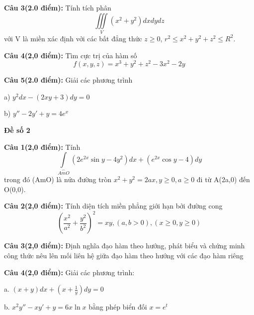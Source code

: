 \documentclass[14pt, a4paper]{article}
\begin{document}
	\vspace{0.5cm}
	
	\textbf{Câu 3(2.0 điểm):} Tính tích phân \[\iiint\limits_V {({x^2} + {y^2})dxdydz}\] với V là miền xác định vởi các bất đẳng thức $ z \geqslant 0 $, $ {r^2} \leqslant {x^2} + {y^2} + {z^2} \leqslant {R^2} $.
	
	\vspace{0.5cm}
	
	\textbf{Câu 4(2,0 điểm):} Tìm cực trị của hàm số \[f(x,y,z) = {x^3} + {y^2} + {z^2} - 3{x^2} - 2y\]
	
	\vspace{0.5cm}
	
	\textbf{Câu 5(2.0 điểm):} Giải các phương trình
	
	a) $ {y^2}dx - (2xy + 3)dy = 0 $
	
	b) $ y'' - 2y' + y = 4{e^x} $
	
	\pagebreak
	
	\begin{center}
		{\large \textbf{Đề số 2}}
	\end{center}

	\textbf{Câu 1(2,0 điểm):} Tính \[\int\limits_{\stackrel\frown{AmO}} {(2{e^{2x}}\sin y - 4{y^2})dx + ({e^{2x}}\cos y - 4)dy} \] trong đó (AmO) là nửa đường tròn $ {x^2} + {y^2} = 2ax,y \geqslant 0,a \geqslant 0 $ đi từ A(2a,0) đến O(0,0).
	
	\vspace{0.5cm}
	
	\textbf{Câu 2(2,0 điểm):} Tính diện tích miền phẳng giới hạn bởi đường cong \[{\left( {\frac{{{x^2}}}{{{a^2}}} + \frac{{{y^2}}}{{{b^2}}}} \right)^2} = xy,(a,b > 0),(x \geqslant 0,y \geqslant 0)\]
	
	\vspace{0.5cm}
	
	\textbf{Câu 3(2,0 điểm):} Định nghĩa đạo hàm theo hướng, phát biểu và chứng minh công thức nêu lên mối liên hệ giữa đạo hàm theo hướng  với các đạo hàm riêng
	
	\vspace{0.5cm}
	
	\textbf{Câu 4(2,0 điểm):} Giải các phương trình:
	
	a. $ (x + y)dx + (x + \frac{1}{y})dy = 0 $
	
	b. $ {x^2}y'' - xy' + y = 6x\ln x $ \hspace{0.5cm} bằng phép biển đối $ x={e^t} $
	
	\vspace{0.5cm}
	
\end{document}
